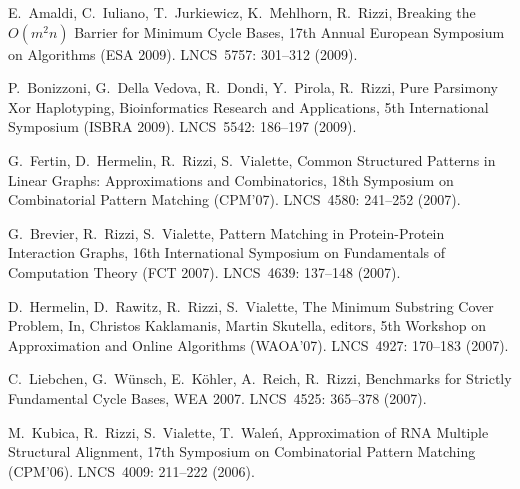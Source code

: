 \begin{etaremune}
\vspace{-1.8mm}
  \item {E.~Amaldi, C.~Iuliano, T.~Jurkiewicz, K.~Mehlhorn, R.~Rizzi},
   \newblock Breaking the $O(m^2n)$ Barrier for Minimum Cycle Bases,
   \newblock 17th Annual European Symposium on Algorithms (ESA 2009).
   \newblock LNCS~5757: 301--312 (2009).

\vspace{-1.8mm}
  \item {P.~Bonizzoni, G.~Della Vedova, R.~Dondi, Y.~Pirola, R.~Rizzi},
   \newblock Pure Parsimony Xor Haplotyping,
   \newblock Bioinformatics Research and Applications, 5th International Symposium (ISBRA 2009).
   \newblock LNCS~5542: 186--197 (2009).

\vspace{-1.8mm}
  \item {G.~Fertin, D.~Hermelin, R.~Rizzi, S.~Vialette},
   \newblock Common Structured Patterns in Linear Graphs: Approximations and Combinatorics,
   \newblock 18th Symposium on Combinatorial Pattern Matching (CPM'07).
   \newblock LNCS~4580: 241--252 (2007).

\vspace{-1.8mm}
  \item {G.~Brevier, R.~Rizzi, S.~Vialette},
   \newblock Pattern Matching in Protein-Protein Interaction Graphs,
   \newblock 16th International Symposium on Fundamentals
              of Computation Theory (FCT 2007).
   \newblock LNCS~4639: 137--148 (2007).

\vspace{-1.8mm}
  \item {D.~Hermelin, D.~Rawitz, R.~Rizzi, S.~Vialette},
   \newblock The Minimum Substring Cover Problem,
   \newblock In, Christos Kaklamanis, Martin Skutella, editors,
   \newblock 5th Workshop on Approximation and Online Algorithms (WAOA'07).
   \newblock LNCS~4927: 170--183 (2007).

\vspace{-1.8mm}
  \item {C.~Liebchen, G.~W\"unsch, E.~K\"ohler, A.~Reich, R.~Rizzi},
   \newblock Benchmarks for Strictly Fundamental Cycle Bases,
   \newblock WEA 2007.
   \newblock LNCS~4525: 365--378 (2007).

\vspace{-1.8mm}
  \item {M.~Kubica, R.~Rizzi, S.~Vialette, T.~Wale\'n},
   \newblock Approximation of RNA Multiple Structural Alignment,
   \newblock 17th Symposium on Combinatorial Pattern Matching (CPM'06).
   \newblock LNCS~4009: 211--222 (2006).


\end{etaremune}
